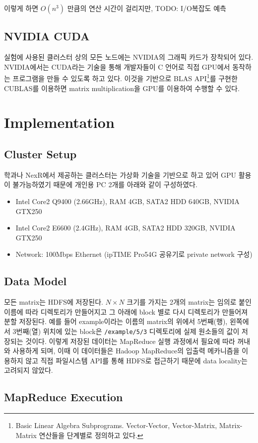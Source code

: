 \documentclass[a4paper]{article}
\begin{document}
\begin{multicols}{2}
이렇게 하면 $O(n^3)$ 만큼의 연산 시간이 걸리지만, {\color{Orange}TODO: I/O복잡도 예측}

\subsection{NVIDIA CUDA}
실험에 사용된 클러스터 상의 모든 노드에는 NVIDIA의 그래픽 카드가 장착되어 있다.
NVIDIA에서는 CUDA라는 기술을 통해 개발자들이 C 언어로 직접 GPU에서 동작하는 프로그램을 만들 수 있도록 하고 있다.
이것을 기반으로 BLAS API\footnote{Basic Linear Algebra Subprograms. Vector-Vector, Vector-Matrix, Matrix-Matrix 연산들을 단계별로 정의하고 있다.}를 구현한 CUBLAS를 이용하면 matrix multiplication을 GPU를 이용하여 수행할 수 있다.


\section{Implementation}
\subsection{Cluster Setup}
학과나 NexR에서 제공하는 클러스터는 가상화 기술을 기반으로 하고 있어 GPU 활용이 불가능하였기 때문에 개인용 PC 2개를 아래와 같이 구성하였다.
\begin{itemize}
	\item Intel Core2 Q9400 (2.66GHz), RAM 4GB, SATA2 HDD 640GB, NVIDIA GTX250
	\item Intel Core2 E6600 (2.4GHz), RAM 4GB, SATA2 HDD 320GB, NVIDIA GTX250
	\item Network: 100Mbps Ethernet (ipTIME Pro54G 공유기로 private network 구성)
\end{itemize}

\subsection{Data Model}
모든 matrix는 HDFS에 저장된다. $N \times N$ 크기를 가지는 2개의 matrix는 임의로 붙인 이름에 따라 디렉토리가 만들어지고 그 아래에 block 별로 다시 디렉토리가 만들어져 분할 저장된다.
예를 들어 example이라는 이름의 matrix의 위에서 5번째(행), 왼쪽에서 3번째(열) 위치에 있는 block은 \texttt{/example/5/3} 디렉토리에 실제 원소들의 값이 저장되는 것이다.
이렇게 저장된 데이터는 MapReduce 실행 과정에서 필요에 따라 꺼내와 사용하게 되며, 이때 이 데이터들은 Hadoop MapReduce의 입출력 메카니즘을 이용하지 않고 직접 파일시스템 API를 통해 HDFS로 접근하기 때문에 data locality는 고려되지 않았다.

\subsection{MapReduce Execution}

\end{multicols}
\end{document}
